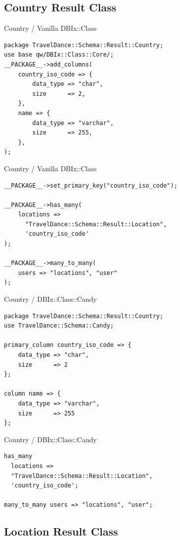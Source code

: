 \subsection{Country Result Class}

\begin{frame}[fragile]{Country / Vanilla DBIx::Class}
\begin{lstlisting}
package TravelDance::Schema::Result::Country;
use base qw/DBIx::Class::Core/;
__PACKAGE__->add_columns(
    country_iso_code => {
        data_type => "char",
        size      => 2,
    },
    name => {
        data_type => "varchar",
        size      => 255,
    },
);
\end{lstlisting}
\end{frame}

\begin{frame}[fragile]{Country / Vanilla DBIx::Class}
\begin{lstlisting}
__PACKAGE__->set_primary_key("country_iso_code");

__PACKAGE__->has_many(
    locations =>
      "TravelDance::Schema::Result::Location",
      'country_iso_code'
);

__PACKAGE__->many_to_many(
    users => "locations", "user"
);
\end{lstlisting}
\end{frame}

\begin{frame}[fragile]{Country / DBIx::Class::Candy}
\begin{lstlisting}
package TravelDance::Schema::Result::Country;
use TravelDance::Schema::Candy;

primary_column country_iso_code => {
    data_type => "char",
    size      => 2
};

column name => {
    data_type => "varchar",
    size      => 255
};
\end{lstlisting}
\end{frame}

\begin{frame}[fragile]{Country / DBIx::Class::Candy}
\begin{lstlisting}
has_many
  locations =>
  "TravelDance::Schema::Result::Location",
  'country_iso_code';

many_to_many users => "locations", "user";
\end{lstlisting}
\end{frame}

\subsection{Location Result Class}

